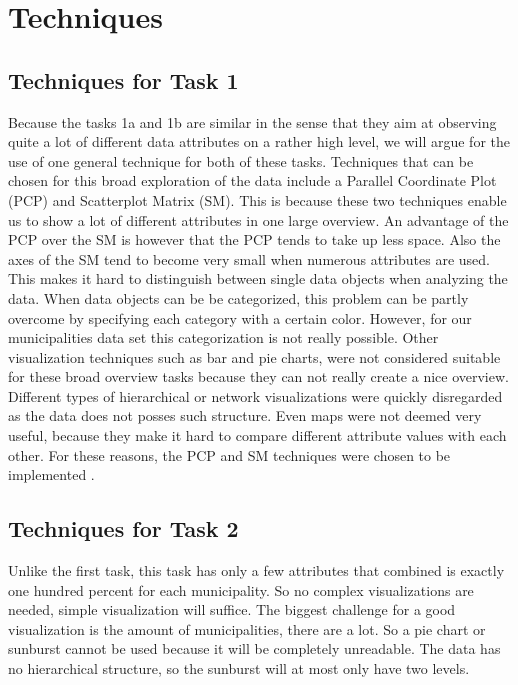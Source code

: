\section{Techniques}\label{sec:techniques}

\subsection{Techniques for Task 1}\label{sec:techniques1}
Because the tasks 1a and 1b are similar in the sense that they aim at observing quite a lot of different data attributes on a rather high level, we will argue for the use of one general technique for both of these tasks. Techniques that can be chosen for this broad exploration of the data include a Parallel Coordinate Plot (PCP) and Scatterplot Matrix (SM). This is because these two techniques enable us to show a lot of different attributes in one large overview. An advantage of the PCP over the SM is however that the PCP tends to take up less space. Also the axes of the SM tend to become very small when numerous attributes are used. This makes it hard to distinguish between single data objects when analyzing the data. When data objects can be be categorized, this problem can be partly overcome by specifying each category with a certain color. However, for our municipalities data set this categorization is not really possible.
Other visualization techniques such as bar and pie charts, were not considered suitable for these broad overview tasks because they can not really create a nice overview. Different types of hierarchical or network visualizations were quickly disregarded as the data does not posses such structure. Even maps were not deemed very useful, because they make it hard to compare different attribute values with each other. For these reasons, the PCP and SM techniques were chosen to be implemented \cite{D3pcp}\cite{D3sm}.



\subsection{Techniques for Task 2}\label{sec:techniques2}
Unlike the first task, this task has only a few attributes that combined is exactly one hundred percent for each municipality.
So no complex visualizations are needed, simple visualization will suffice.
The biggest challenge for a good visualization is the amount of municipalities, there are a lot.
So a pie chart or sunburst cannot be used because it will be completely unreadable.
The data has no hierarchical structure, so the sunburst will at most only have two levels.


